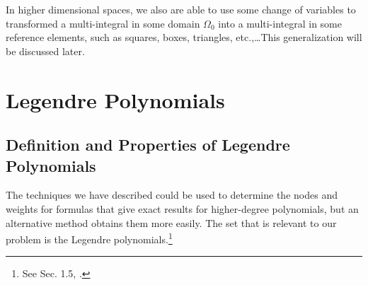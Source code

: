 \documentclass[a4paper]{article}
\numberwithin{equation}{section}
\begin{document}
In higher dimensional spaces, we also are able to use some change of variables to transformed a multi-integral in some domain $\Omega _0$ into a multi-integral in some reference elements, such as squares, boxes, triangles, etc.,\ldots This generalization will be discussed later.
\section{Legendre Polynomials}
\subsection{Definition and Properties of Legendre Polynomials}
The techniques we have described could be used to determine the nodes and weights for formulas that give exact results for higher-degree polynomials, but an alternative method obtains them more easily. The set that is relevant to our problem is the Legendre polynomials.\footnote{See Sec. 1.5, \cite{pde}.}
\end{document}
